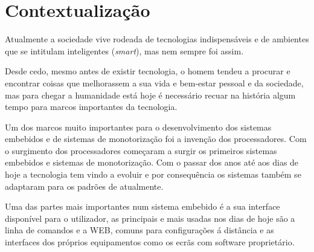 \section{Contextualização}
\par
Atualmente a sociedade vive rodeada de tecnologias indispensáveis e de ambientes que se intitulam inteligentes (\textit{smart}), mas nem sempre foi assim.\par
Desde cedo, mesmo antes de existir tecnologia, o homem tendeu a procurar e encontrar coisas que melhorassem a sua vida e bem-estar pessoal e da sociedade, mas para chegar a humanidade está hoje é necessário recuar na história algum tempo para marcos importantes da tecnologia.\par
Um dos marcos muito importantes para o desenvolvimento dos sistemas embebidos e de sistemas de monotorização foi a invenção dos processadores. Com o surgimento dos processadores começaram a surgir os primeiros sistemas embebidos e sistemas de monotorização. Com o passar dos anos até aos dias de hoje a tecnologia tem vindo a evoluir e por consequência os sistemas também se adaptaram para os padrões de atualmente.\par
Uma das partes mais importantes num sistema embebido é a sua interface disponível para o utilizador, as principais e mais usadas nos dias de hoje são a linha de comandos e a WEB, comuns para configurações á distância e as interfaces dos próprios equipamentos como os ecrãs com software proprietário.

